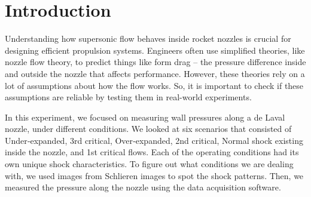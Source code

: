 \chapter{Introduction}
\label{cp:introduction}
Understanding how supersonic flow behaves inside rocket nozzles is crucial for designing efficient propulsion systems. Engineers often use simplified theories, like nozzle flow theory, to predict things like form drag – the pressure difference inside and outside the nozzle that affects performance. However, these theories rely on a lot of assumptions about how the flow works. So, it is important to check if these assumptions are reliable by testing them in real-world experiments.

In this experiment, we focused on measuring wall pressures along a de Laval nozzle, under different conditions. We looked at six scenarios that consisted of Under‐expanded, 3rd critical, Over‐expanded, 2nd critical, Normal shock existing inside the nozzle, and 1st critical flows. Each of the operating conditions had its own unique shock characteristics. To figure out what conditions we are dealing with, we used images from Schlieren images to spot the shock patterns. Then, we measured the pressure along the nozzle using the data acquisition software. 




